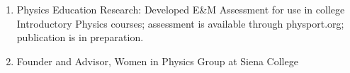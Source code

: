 \documentclass[11pt]{article}
\begin{document}
\begin{flushleft}
\begin{enumerate}
\vspace{-.2cm}\item Physics Education Research: Developed E\&M
Assessment for use in college Introductory Physics courses;
  assessment is available through physport.org;
  publication is in preparation.
\vspace{-.2cm}\item Founder and Advisor, Women in Physics Group at Siena College

\end{enumerate}
\end{flushleft}
\end{document}
